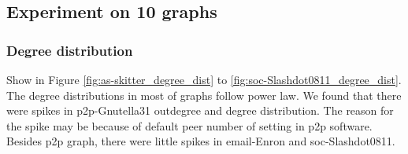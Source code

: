 

\subsection{Experiment on 10 graphs}

\subsubsection{Degree distribution}

Show in Figure \ref{fig:as-skitter_degree_dist} to  \ref{fig:soc-Slashdot0811_degree_dist}.
\\
The degree distributions in most of graphs follow power law. We found that there were spikes in p2p-Gnutella31 outdegree and degree distribution. The reason for the spike may be because of default peer number of setting in p2p software. Besides p2p graph, there were little spikes in email-Enron and soc-Slashdot0811. 

